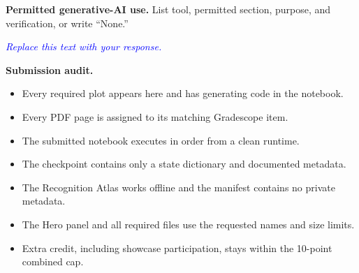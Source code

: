 \documentclass[11pt]{article}
\newcommand{\response}{\textcolor{blue}{\emph{Replace this text with your response.}}}
\begin{document}
\textbf{Permitted generative-AI use.} List tool, permitted section, purpose, and verification, or write ``None.''\par
\response

\textbf{Submission audit.}
\begin{itemize}[label=$\square$]
  \item Every required plot appears here and has generating code in the notebook.
  \item Every PDF page is assigned to its matching Gradescope item.
  \item The submitted notebook executes in order from a clean runtime.
  \item The checkpoint contains only a state dictionary and documented metadata.
  \item The Recognition Atlas works offline and the manifest contains no private metadata.
  \item The Hero panel and all required files use the requested names and size limits.
  \item Extra credit, including showcase participation, stays within the 10-point combined cap.
\end{itemize}
\end{document}
